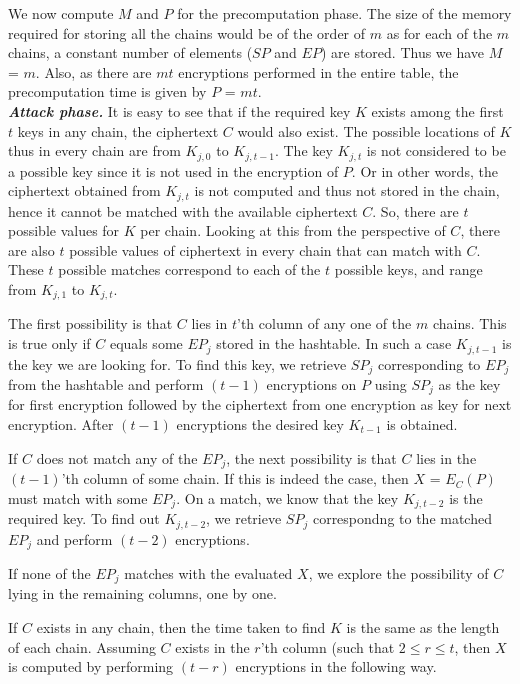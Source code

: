 We now compute $M$ and $P$ for the precomputation phase. The size of the memory required for storing all the chains would be of the order of $m$ as for each of the $m$ chains, a constant number of elements ($SP$ and $EP$) are stored. Thus we have $M$ = $m$. Also, as there are $mt$ encryptions performed in the entire table, the precomputation time is given by $P$ = $mt$.\\

\noindent \textit{\textbf{Attack phase.}} It is easy to see that if the required key $K$ exists among the first $t$ keys in any chain, the ciphertext $C$ would also exist. The possible locations of $K$ thus in every chain are from $K_{j,0}$ to $K_{j,t-1}$. The key $K_{j,t}$ is not considered to be a possible key since it is not used in the encryption of $P$. Or in other words, the ciphertext obtained from $K_{j,t}$ is not computed and thus not stored in the chain, hence it cannot be matched with the available ciphertext $C$. So, there are $t$ possible values for $K$ per chain. Looking at this from the perspective of $C$, there are also $t$ possible values of ciphertext in every chain that can match with $C$. These $t$ possible matches correspond to each of the $t$ possible keys, and range from $K_{j,1}$ to $K_{j,t}$.

The first possibility is that $C$ lies in $t$'th column of any one of the $m$ chains. This is true only if $C$ equals some $EP_j$ stored in the hashtable. In such a case $K_{j,t-1}$ is the key we are looking for. To find this key, we retrieve $SP_j$ corresponding to $EP_j$ from the hashtable and perform $(t-1)$ encryptions on $P$ using $SP_j$ as the key for first encryption followed by the ciphertext from one encryption as key for next encryption. After $(t-1)$ encryptions the desired key $K_{t-1}$ is obtained. 

If $C$ does not match any of the $EP_j$, the next possibility is that $C$ lies in the $(t-1)$'th column of some chain. If this is indeed the case, then $X$ = $E_{C}(P)$ must match with some $EP_j$. On a match, we know that the key $K_{j,t-2}$ is the required key. To find out $K_{j,t-2}$, we retrieve $SP_j$ correspondng to the matched $EP_j$ and perform $(t-2)$ encryptions. 

If none of the $EP_j$ matches with the evaluated $X$, we explore the possibility of $C$ lying in the remaining columns, one by one.

If $C$ exists in any chain, then the time taken to find $K$ is the same as the length of each chain. Assuming $C$ exists in the $r$'th column (such that  $2 \leq r \leq t$, then $X$ is computed by performing $(t-r)$ encryptions in the following way.

